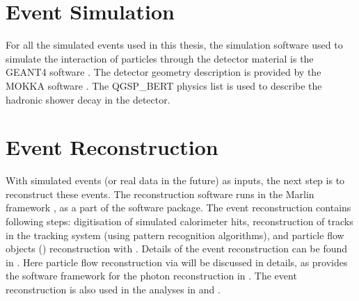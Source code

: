 
\section{Event Simulation}

For all the simulated events used in this thesis, the simulation software used to simulate the interaction of particles through the detector material is the GEANT4 software \cite{Agostinelli:2002hh}. The detector geometry description is provided by the MOKKA software \cite{MoradeFreitas:2002kj}.  The QGSP\_BERT physics list is used to describe the hadronic shower decay in the detector.


\section{Event Reconstruction}

With simulated events (or real data in the future) as inputs, the next step is to reconstruct these events. The reconstruction software runs in the Marlin framework \cite{Gaede:2006pj}, as a part of the \ilcsoft software package. The event reconstruction contains following steps: digitisation of simulated calorimeter hits, reconstruction of tracks in the tracking system (using pattern recognition algorithms), and particle flow objects (\PFOs) reconstruction with \pandora\cite{Thomson:2009rp,Marshall:2012ry}. Details of the event reconstruction can be found in \cite{Brau:2007zza,Linssen:2012hp}. Here particle flow reconstruction via \pandora will be discussed in details, as \pandora provides the software framework for the photon reconstruction in . The \pandora event reconstruction is also used in the analyses in   and .

